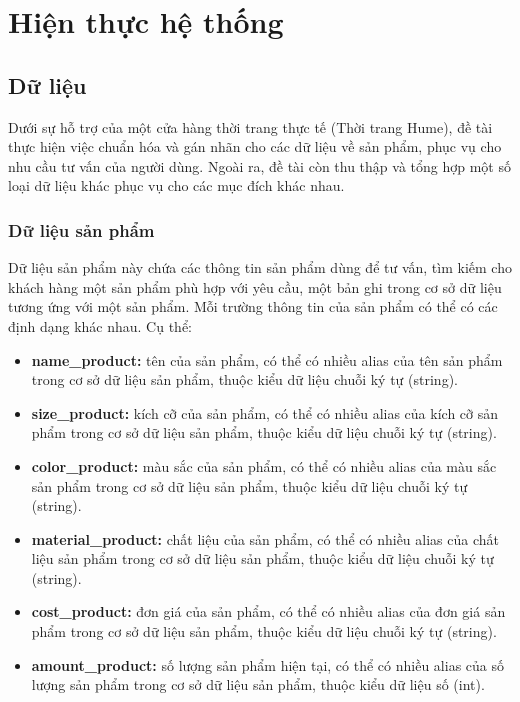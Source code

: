 \chapter{Hiện thực hệ thống}

\section{Dữ liệu}
\label{sec:database}
Dưới sự hỗ trợ của một cửa hàng thời trang thực tế (Thời trang Hume),
đề tài thực hiện việc chuẩn hóa và gán nhãn cho các dữ liệu về
sản phẩm, phục vụ cho nhu cầu tư vấn của người dùng. Ngoài ra, đề tài
còn thu thập và tổng hợp một số loại dữ liệu khác phục vụ cho các
mục đích khác nhau.

\subsection{Dữ liệu sản phẩm}
\label{subsec:productdb}
Dữ liệu sản phẩm này chứa các thông tin sản phẩm dùng để tư vấn,
tìm kiếm cho khách hàng một sản phẩm phù hợp với yêu cầu, một bản ghi
trong cơ sở dữ liệu tương ứng với một sản phẩm. Mỗi trường thông tin
của sản phẩm có thể có các định dạng khác nhau. Cụ thể:

\begin{itemize}
    \item \textbf{name\_product:} tên của sản phẩm, có thể có nhiều
    alias của tên sản phẩm trong cơ sở dữ liệu sản phẩm, thuộc kiểu
    dữ liệu chuỗi ký tự (string).
    \item \textbf{size\_product:} kích cỡ của sản phẩm, có thể có
    nhiều alias của kích cỡ sản phẩm trong cơ sở dữ liệu sản phẩm,
    thuộc kiểu dữ liệu chuỗi ký tự (string).
    \item \textbf{color\_product:} màu sắc của sản phẩm, có thể có
    nhiều alias của màu sắc sản phẩm trong cơ sở dữ liệu sản phẩm,
    thuộc kiểu dữ liệu chuỗi ký tự (string).
    \item \textbf{material\_product:} chất liệu của sản phẩm, có thể
    có nhiều alias của chất liệu sản phẩm trong cơ sở dữ liệu
    sản phẩm, thuộc kiểu dữ liệu chuỗi ký tự (string).
    \item \textbf{cost\_product:} đơn giá của sản phẩm, có thể có
    nhiều alias của đơn giá sản phẩm trong cơ sở dữ liệu sản phẩm,
    thuộc kiểu dữ liệu chuỗi ký tự (string).
    \item \textbf{amount\_product:} số lượng sản phẩm hiện tại,
    có thể có nhiều alias của số lượng sản phẩm trong cơ sở dữ liệu
    sản phẩm, thuộc kiểu dữ liệu số (int).
\end{itemize}

